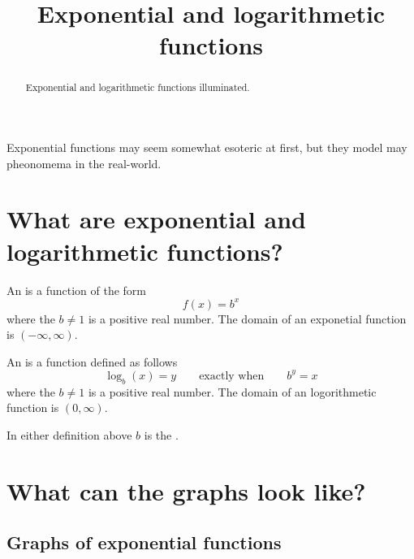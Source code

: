 \documentclass{ximera}
\title[Dig-In:]{Exponential and logarithmetic functions}
\begin{document}
\begin{abstract}
  Exponential and logarithmetic functions illuminated.
\end{abstract}
\maketitle

Exponential functions may seem somewhat esoteric at first, but they
model may pheonomema in the real-world.




\section{What are exponential and logarithmetic functions?}


\begin{definition}
  An  is a function of the form
  \[
  f(x) = b^x
  \]
  where the $b\ne 1$ is a positive real number. The domain of an
  exponetial function is $(-\infty,\infty)$.
\end{definition}


\begin{definition}
  An  is a function defined as follows
  \[
  \log_b(x) = y \qquad\text{exactly when}\qquad b^y = x
  \]
  where the $b\ne 1$ is a positive real number. The domain of an
  logorithmetic function is $(0,\infty)$.
\end{definition}

In either definition above $b$ is the .




\section{What can the graphs look like?}

\subsection{Graphs of exponential functions}
\end{document}
